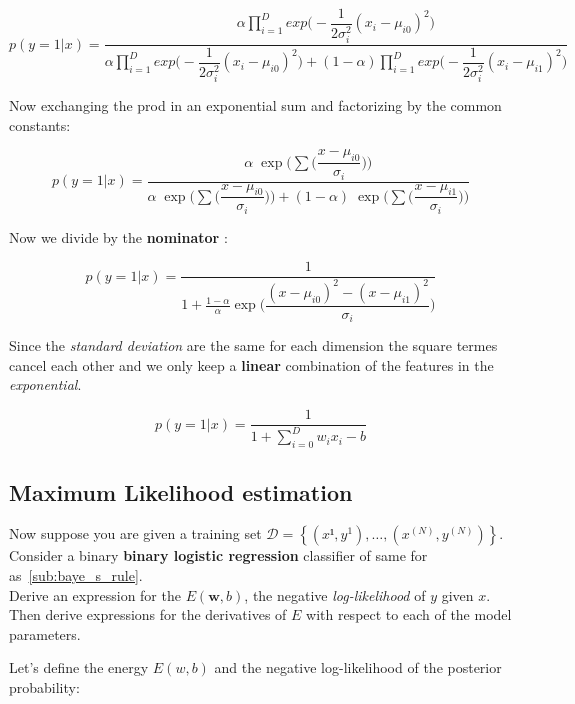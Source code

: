\documentclass[a4paper]{tufte-handout}
\begin{document}
\begin{equation}
  p(y=1|x) = \dfrac{ \alpha \prod_{i=1}^D
  exp\big(-\dfrac{1}{2\sigma_i^2}(x_i-\mu_{i0})^2 \big)}
  {\alpha \prod_{i=1}^D
  exp\big(-\dfrac{1}{2\sigma_i^2}(x_i-\mu_{i0})^2 \big)+
  (1-\alpha)\prod_{i=1}^D
  exp\big(-\dfrac{1}{2\sigma_i^2}(x_i-\mu_{i1})^2 \big)}
\end{equation}

Now exchanging the prod in an exponential sum and factorizing by the common
constants:

\begin{equation}
  p(y=1|x) = \dfrac{\alpha \;\exp\Big(
    \sum\big(\dfrac{x-\mu_{i0}}{\sigma_{i}}\big) \Big)}{
  \alpha \;\exp\Big(
    \sum\big(\dfrac{x-\mu_{i0}}{\sigma_{i}}\big) \Big)
  +
  (1-\alpha) \;\exp\Big(
    \sum\big(\dfrac{x-\mu_{i1}}{\sigma_{i}}\big) \Big)
  } 
\end{equation}


Now we divide by the \textbf{nominator} :

\begin{equation}
  p(y=1|x) = \dfrac{1}{1+\frac{1-\alpha}{\alpha} \exp\big(
  \dfrac{(x-\mu_{i0})^2-(x-\mu_{i1})^2}{\sigma_i}\big) }
\end{equation}


Since the \emph{standard deviation} are the same for each dimension the square
termes cancel each other and we only keep a \textbf{linear} combination of the
features in the \emph{exponential}.


\begin{equation}
  p(y=1|x) = \dfrac{1}{1+ \sum_{i=0}^D w_i x_i-b}
\end{equation}


\subsection{Maximum Likelihood estimation}%
\label{sub:maximum_likelihood}

Now suppose you are given a training set $\mathcal{D} = \left\{ (x¹,y^1),\ldots,
(x^(N),y^(N))\right\}$. Consider a binary \textbf{binary logistic regression}
classifier of same for as~\ref{sub:baye_s_rule}.\\

Derive an expression for the $E(\mathbf{w},b)$, the negative
\emph{log-likelihood} of $y$ given $x$. Then derive expressions for the
derivatives of $E$ with respect to each of the model parameters.


Let's  define the energy $E(w,b)$ and the negative log-likelihood of the
posterior probability:
\end{document}
